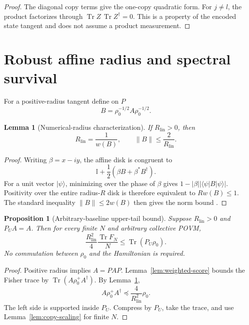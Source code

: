 \documentclass[aps,pra,preprint,nofootinbib]{revtex4-2}
\newtheorem{proposition}{Proposition}
\newtheorem{lemma}{Lemma}
\newcommand{\Tr}{\operatorname{Tr}}
\newcommand{\id}{\mathbb I}
\newcommand{\Rlin}{R_{\mathrm{lin}}}
\newcommand{\rhozero}{\rho_0}
\begin{document}
\begin{proof}
The diagonal copy terms give the one-copy quadratic form. For $j\neq l$, the product factorizes through $\Tr Z\,\Tr Z^\dagger=0$. This is a property of the encoded state tangent and does not assume a product measurement.
\end{proof}

\section{Robust affine radius and spectral survival}
\label{supp:robust}

For a positive-radius tangent define on $P$
\begin{equation}
B=\rhozero^{-1/2}A\rhozero^{-1/2}.
\end{equation}

\begin{lemma}[Numerical-radius characterization]
\label{lem:numerical-radius}
If $\Rlin>0$, then
\begin{equation}
\Rlin=\frac1{w(B)},
\qquad
\|B\|\le\frac2{\Rlin}.
\end{equation}
\end{lemma}

\begin{proof}
Writing $\beta=x-iy$, the affine disk is congruent to
\begin{equation}
\id+\frac12(\beta B+\beta^*B^\dagger).
\end{equation}
For a unit vector $|\psi\rangle$, minimizing over the phase of $\beta$ gives $1-|\beta||\langle\psi|B|\psi\rangle|$. Positivity over the entire radius-$R$ disk is therefore equivalent to $Rw(B)\le1$. The standard inequality $\|B\|\le2w(B)$ then gives the norm bound \cite{BhatiaJain2023}.
\end{proof}

\begin{proposition}[Arbitrary-baseline upper-tail bound]
\label{prop:nonstationary-tail}
Suppose $\Rlin>0$ and $P_UA=A$. Then for every finite $N$ and arbitrary collective POVM,
\begin{equation}
\frac{\Rlin^2}{4}\frac{\Tr F_N}{N}
\le\Tr(P_U\rhozero).
\label{eq:nonstationary-tail}
\end{equation}
No commutation between $\rhozero$ and the Hamiltonian is required.
\end{proposition}

\begin{proof}
Positive radius implies $A=PAP$. Lemma~\ref{lem:weighted-score} bounds the Fisher trace by $\Tr(A\rhozero^+A^\dagger)$. By Lemma~\ref{lem:numerical-radius},
\begin{equation}
A\rhozero^+A^\dagger
\preceq\frac4{\Rlin^2}\rhozero.
\end{equation}
The left side is supported inside $P_U$. Compress by $P_U$, take the trace, and use Lemma~\ref{lem:copy-scaling} for finite $N$.
\end{proof}
\end{document}
